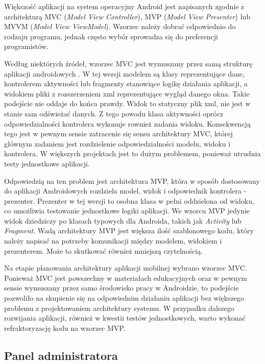 \documentclass[a4paper,twoside,12pt]{book}
\newcommand{\obcy}[1]{\emph{#1}}
\newcommand{\english}[1]{{\selectlanguage{british}\obcy{#1}}}
\begin{document}
Większość aplikacji na system operacyjny Android jest napisanych zgodnie z architekturą MVC (\english{Model View Controller}), MVP (\english{Model View Presenter}) lub MVVM (\english{Model View ViewModel}). Wzorzec należy dobrać odpowiednio do rodzaju programu, jednak często wybór sprowadza się do preferencji programistów. 

Według niektórych źródeł, wzorzec MVC jest wymuszany przez samą strukturę aplikacji androidowych \cite{bib:internetMVC}. W tej wersji modelem są klasy reprezentujące dane, kontrolerem aktywności lub fragmenty stanowiące logikę działania aplikacji, a widokiem pliki z rozszerzeniem xml reprezentujące wygląd danego okna. Takie podejście nie oddaje do końca prawdy. Widok to statyczny plik xml, nie jest w stanie sam odświeżać danych. Z tego powodu klasa aktywności oprócz odpowiedzialności kontrolera wykonuje rownież zadania widoku. Konsekwencją tego jest w pewnym sensie zatracenie się sensu architektury MVC, której głównym zadaniem jest rozdzielenie odpowiedzialności modelu, widoku i kontrolera. W większych projektach jest to dużym problemem, ponieważ utrudnia testy jednostkowe aplikacji.

Odpowiedzią na ten problem jest architektura MVP, która w sposób dostosowany do aplikacji Androidowych rozdziela model, widok i odpowiednik kontrolera - prezenter. Prezenter w tej wersji to osobna klasa w pełni oddzielona od widoku, co umożliwia testowanie jednostkowe logiki aplikacji. We wzorcu MVP jedynie widok dziedziczy po klasach typowych dla Androida, takich jak \english{Activity} lub \english{Fragment}. Wadą architektury MVP jest większa ilość szablonowego kodu, który należy napisać na potrzeby komunikacji między modelem, widokiem i prezenterem. Może to skutkować również mniejszą czytelnością.

Na etapie planowania architektury aplikacji mobilnej wybrano wzorzec MVC. Ponieważ MVC jest powszechny w materiałach edukacyjnych oraz w pewnym sensie wymuszany przez samo środowisko pracy w Androidzie, to podejście pozwoliło na skupienie się na odpowiednim działaniu aplikacji bez większego problemu z projektowaniem architektury systemu. W przypadku dalszego rozwijania aplikacji, również w kwestii testów jednostkowych, warto wykonać refraktoryzację kodu na wzorzec MVP. 

\subsection{Panel administratora}
\end{document}
